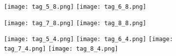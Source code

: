 \documentclass{article}
\begin{document}
\begin{figure}[h]
\texttt{[image: tag\_5\_8.png]} 
\texttt{[image: tag\_6\_8.png]} 


\texttt{[image: tag\_7\_8.png]} 
\texttt{[image: tag\_8\_8.png]} 


\texttt{[image: tag\_5\_4.png]} 
\texttt{[image: tag\_6\_4.png]} 
\texttt{[image: tag\_7\_4.png]} 
\texttt{[image: tag\_8\_4.png]} 

\end{figure}
\end{document}
